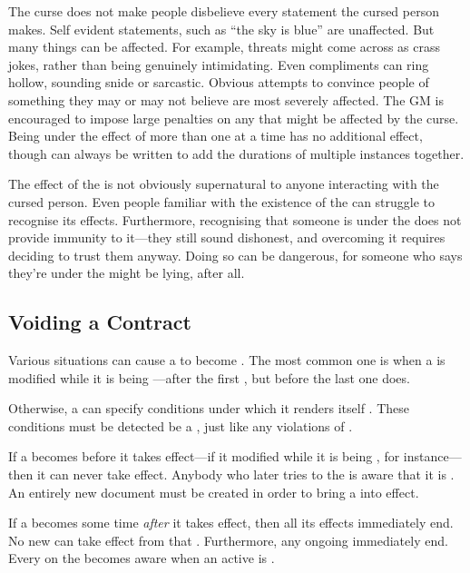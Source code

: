 The curse does not make people disbelieve every statement the cursed person makes.
Self evident statements, such as ``the sky is blue'' are unaffected.
But many things can be affected.
For example, threats might come across as crass jokes, rather than being genuinely intimidating.
Even compliments can ring hollow, sounding snide or sarcastic.
Obvious attempts to convince people of something they may or may not believe are most severely affected.
The GM is encouraged to impose large penalties on any {\tests} that might be affected by the curse.
Being under the effect of more than one {\liarscurse} at a time has no additional effect, though {\contracts} can always be written to add the durations of multiple instances together.

The effect of the {\liarscurse} is not obviously supernatural to anyone interacting with the cursed person.
Even people familiar with the existence of the {\liarscurse} can struggle to recognise its effects.
Furthermore, recognising that someone is under the {\liarscurse} does not provide immunity to it---they still sound dishonest, and overcoming it requires deciding to trust them anyway.
Doing so can be dangerous, for someone who says they're under the {\liarscurse} might be lying, after all.

\subsection{Voiding a Contract}

Various situations can cause a {\contract} to become {\void}.
The most common one is when a {\contract} is modified while it is being {\signed}---after the first {\signatory} {\signs}, but before the last one does.

Otherwise, a {\contract} can specify conditions under which it renders itself {\void}.
These conditions must be detected be a {\signatory}, just like any violations of {\stipulations}.

If a {\contract} becomes {\void} before it takes effect---if it modified while it is being {\signed}, for instance---then it can never take effect.
Anybody who later tries to {\sign} the {\contract} is aware that it is {\void}.
An entirely new document must be created in order to bring a {\contract} into effect.

If a {\contract} becomes {\void} some time \emph{after} it takes effect, then all its effects immediately end.
No new {\penalties} can take effect from that {\contract}.
Furthermore, any ongoing {\penalties} immediately end.
Every {\signatory} on the {\contract} becomes aware when an active {\contract} is {\voided}.

